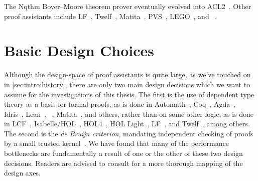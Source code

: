 The Nqthm Boyer--Moore theorem prover eventually evolved into ACL2~\cite{ACL2,ACL2Applications}.
Other proof assistants include LF~\cite{pfenning1991logic,harper93,Logical2002Pfenning}, Twelf~\cite{pfenning1999system}, Matita~\cite{asperti2007user,Matita2011Asperti}, PVS~\cite{owre1996pvs,PVS1992Owre}, LEGO~\cite{LEGO1994Pollack}, and \NuPRL~\cite{nuprl}.


\section{Basic Design Choices}\label{sec:intro:proof-assistant-design-choices}
Although the design-space of proof assistants is quite large, as we've touched on in \autoref{sec:intro:history}, there are only two main design decisions which we want to assume for the investigations of this thesis.
The first is the use of dependent type theory as a basis for formal proofs, as is done in Automath~\cite{wiki:AutoMath,mathematical1970Bruijn,Survey1994deBruijn}, Coq~\cite{Coq}, Agda~\cite{Dependently2009Norell}, Idris~\cite{Idris2013Brady}, Lean~\cite{Lean2015Moura}, \NuPRL~\cite{nuprl}, Matita~\cite{Matita2011Asperti}, and others, rather than on some other logic, as is done in LCF~\cite{LCF2000Gordon,gordon1979edinburgh,gordon1978metalanguage}, Isabelle/HOL~\cite{LCF2019Paulson,Isabelle/Isar2002Wenzel,Isabelle,paulson1994isabelle}, HOL4~\cite{slind2008brief}, HOL Light~\cite{harrison1996hol}, LF~\cite{pfenning1991logic,harper93}, and Twelf~\cite{pfenning1999system}, among others.
The second is the \emph{de Bruijn criterion}, mandating independent checking of proofs by a small trusted kernel~\cite{challenge2005Barendregt}.
We have found that many of the performance bottlenecks are fundamentally a result of one or the other of these two design decisions.
Readers are advised to consult \textcite[ch.~4]{ringer2020qed} for a more thorough mapping of the design axes.

